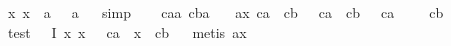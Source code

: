 \begin{isabellebody}
\ {\isachardoublequoteopen}{\isacharparenleft}\isactrlbold {\isasymexists}x{\isachardot}\ x\ \isactrlbold {\isacharequal}\ a{\isacharparenright}\ \isactrlbold {\isasymrightarrow}\ \ {\isasymA}{\isacharparenleft}a{\isacharparenright}{\isachardoublequoteclose}%
\isadelimproof
\ %
\endisadelimproof
%
\isatagproof
{}\isamarkupfalse%
\ simp%
\endisatagproof
{\isafoldproof}%
%
\isadelimproof
%
\endisadelimproof
\isanewline
\isanewline
\isanewline
\ \ \isanewline
{}\isamarkupfalse%
\ ca{\isacharcolon}{\isacharcolon}{\isacharprime}a\ cb{\isacharcolon}{\isacharcolon}{\isacharprime}a\ \isanewline
{}\isamarkupfalse%
\ \ ax{}{\isacharcolon}\ {\isachardoublequoteopen}{\isasymA}{\isacharparenleft}ca{\isacharparenright}\ \isactrlbold {\isasymand}\ {\isasymA}{\isacharparenleft}cb{\isacharparenright}\ \isactrlbold {\isasymand}\ \isactrlbold {\isasymnot}\ {\isacharparenleft}ca\ \isactrlbold {\isacharequal}\ cb{\isacharparenright}\ \isactrlbold {\isasymand}\ \isactrlbold {\isasymnot}\ {\isacharparenleft}ca\ \isactrlbold {\isacharequal}\ {\isasymOtimes}{\isacharparenright}\ \isactrlbold {\isasymand}\ \isactrlbold {\isasymnot}\ {\isacharparenleft}cb\ \isactrlbold {\isacharequal}\ {\isasymOtimes}{\isacharparenright}{\isachardoublequoteclose}\isanewline
{}\isamarkupfalse%
\ test{}{\isacharcolon}\ {\isachardoublequoteopen}{\isasymOtimes}\ \isactrlbold {\isacharequal}\ {\isacharparenleft}\isactrlbold I\ {\isacharparenleft}{\isasymlambda}x{\isachardot}\ x\ \ \isactrlbold {\isacharequal}\ ca\ \isactrlbold {\isasymor}\ x\ \isactrlbold {\isacharequal}\ cb{\isacharparenright}{\isacharparenright}{\isachardoublequoteclose}%
\isadelimproof
\ %
\endisadelimproof
%
\isatagproof
{}\isamarkupfalse%
\ {\isacharparenleft}metis\ ax{}{\isacharparenright}%
\endisatagproof
{\isafoldproof}%
%
\isadelimproof
%
\endisadelimproof
\isanewline
%
\isadelimtheory
\isanewline
%
\endisadelimtheory
%
\isatagtheory
{}\isamarkupfalse%
%
\endisatagtheory
{\isafoldtheory}%
%
\isadelimtheory
%
\endisadelimtheory
\end{isabellebody}%
